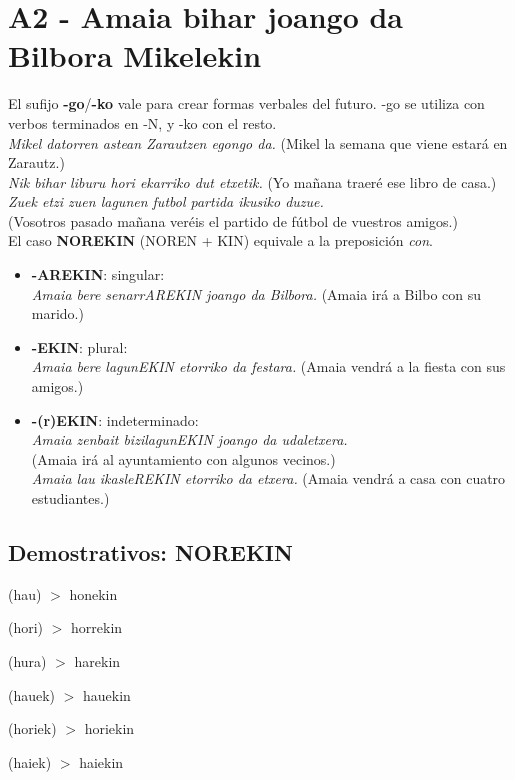 \documentclass[11pt, a4paper]{article}
\begin{document}
\section{A2 - Amaia bihar joango da Bilbora Mikelekin}
\noindent El sufijo \textbf{-go}/\textbf{-ko} vale para crear formas verbales del futuro. -go se utiliza con verbos terminados en -N, y -ko con el resto.\\
\indent \textit{Mikel datorren astean Zarautzen egongo da.}
(Mikel la semana que viene estará en Zarautz.)\\
\indent \textit{Nik bihar liburu hori ekarriko dut etxetik.}
(Yo mañana traeré ese libro de casa.)\\
\indent \textit{Zuek etzi zuen lagunen futbol partida ikusiko duzue.}\\
\indent (Vosotros pasado mañana veréis el partido de fútbol de vuestros amigos.)\\

\noindent El caso \textbf{NOREKIN} (NOREN + KIN) equivale a la preposici\'on \textit{con}.
\begin{itemize}
\item \textbf{-AREKIN}: singular:\\
\textit{Amaia bere senarrAREKIN joango da Bilbora.} (Amaia irá a Bilbo con su marido.)
\item \textbf{-EKIN}: plural:\\
\textit{Amaia bere lagunEKIN etorriko da festara.} (Amaia vendrá a la fiesta con sus amigos.)
\item \textbf{-(r)EKIN}: indeterminado:\\
\textit{Amaia zenbait bizilagunEKIN joango da udaletxera.}\\
(Amaia irá al ayuntamiento con algunos vecinos.)\\
\textit{Amaia lau ikasleREKIN etorriko da etxera.}
(Amaia vendrá a casa con cuatro estudiantes.)
\end{itemize}

\subsection{Demostrativos: NOREKIN}
\begin{itemize}
\begin{multicols}{2}
\item (hau) $>$ honekin
\item (hori) $>$ horrekin
\item (hura) $>$ harekin
\item (hauek) $>$ hauekin
\item (horiek) $>$ horiekin
\item (haiek) $>$ haiekin
\end{multicols}
\end{itemize}
\end{document}
